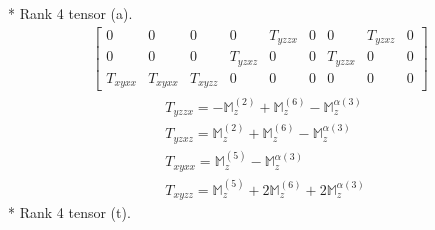 \documentclass[fleqn,8pt,landscape]{jsarticle}
\begin{document}
* Rank 4 tensor (a).
\begin{align*}
\begin{bmatrix} 0 & 0 & 0 & 0 & T_{yzzx} & 0 & 0 & T_{yzxz} & 0 \\ 0 & 0 & 0 & T_{yzxz} & 0 & 0 & T_{yzzx} & 0 & 0 \\ T_{xyxx} & T_{xyxx} & T_{xyzz} & 0 & 0 & 0 & 0 & 0 & 0 \end{bmatrix}
\end{align*}
\begin{align*}
& T_{yzzx} = - \mathbb{M}_{z}^{(2)} + \mathbb{M}_{z}^{(6)} - \mathbb{M}_{z}^{\alpha(3)} \\
& T_{yzxz} = \mathbb{M}_{z}^{(2)} + \mathbb{M}_{z}^{(6)} - \mathbb{M}_{z}^{\alpha(3)} \\
& T_{xyxx} = \mathbb{M}_{z}^{(5)} - \mathbb{M}_{z}^{\alpha(3)} \\
& T_{xyzz} = \mathbb{M}_{z}^{(5)} + 2 \mathbb{M}_{z}^{(6)} + 2 \mathbb{M}_{z}^{\alpha(3)}
\end{align*}
* Rank 4 tensor (t).
\end{document}
